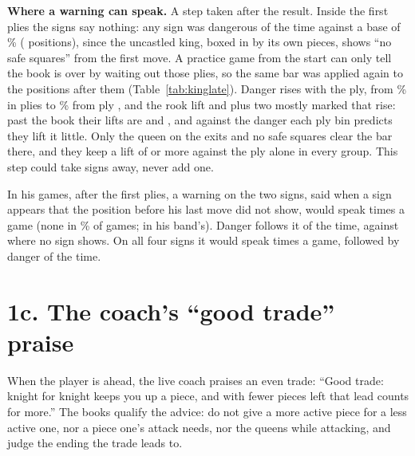 \documentclass[11pt]{article}
\begin{document}
\textbf{Where a warning can speak.} A step taken after the result. Inside the first \BookPlies{}
plies the signs say nothing: any sign was dangerous \KingEarlyAny{} of the time against a base of
\KingEarlyBase\% (\KingEarlyPositions{} positions), since the uncastled king, boxed in by its own
pieces, shows ``no safe squares'' from the first move. A practice game from the start can only tell
the book is over by waiting out those plies, so the same bar was applied again to the
\KingLatePositions{} positions after them (Table~\ref{tab:kinglate}). Danger rises with the ply, from
\KingBinFirst\% in plies \KingBinFirstPlies{} to \KingBinLast\% from ply \KingBinLastFrom, and the rook lift and plus two mostly
marked that rise: past the book their lifts are \KingLateRookLift{} and \KingLatePlusTwo, and against
the danger each ply bin predicts they lift it little. Only the queen on the exits and no safe squares
clear the bar there, and they keep a lift of \KingLiftBar{} or more against the ply alone in every group. This
step could take signs away, never add one.

\begin{table}[h]
\centering
\scriptsize\KingLateTable
\caption{The four signs that cleared the bar, on his band's positions after the first \BookPlies{}
plies. ``Against the ply alone'' is the danger observed over the danger expected from the base rate of
each ply bin (\KingBins).}
\label{tab:kinglate}
\end{table}

In his games, after the first \BookPlies{} plies, a warning on the two signs, said when a sign appears
that the position before his last move did not show, would speak \KingNotesPerGame{} times a game
(none in \KingNotesSilent\% of games; \KingNotesHisBand{} in his band's). Danger follows it
\KingOnsetDanger{} of the time, against \KingNoneDanger{} where no sign shows. On all four signs it
would speak \KingNotesAllPerGame{} times a game, followed by danger \KingAllOnsetDanger{} of the time.

\section{1c. The coach's ``good trade'' praise}

When the player is ahead, the live coach praises an even trade: ``Good trade: knight for knight keeps
you up a piece, and with fewer pieces left that lead counts for more.'' The books qualify the advice:
do not give a more active piece for a less active one, nor a piece one's attack needs, nor the queens
while attacking, and judge the ending the trade leads to.
\end{document}
